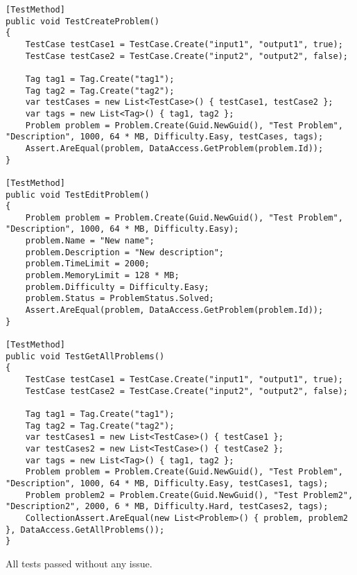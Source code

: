 \documentclass[report.tex]{subfiles}
\begin{document}
\begin{verbatim}
[TestMethod]
public void TestCreateProblem()
{
    TestCase testCase1 = TestCase.Create("input1", "output1", true);
    TestCase testCase2 = TestCase.Create("input2", "output2", false);

    Tag tag1 = Tag.Create("tag1");
    Tag tag2 = Tag.Create("tag2");
    var testCases = new List<TestCase>() { testCase1, testCase2 };
    var tags = new List<Tag>() { tag1, tag2 };
    Problem problem = Problem.Create(Guid.NewGuid(), "Test Problem", "Description", 1000, 64 * MB, Difficulty.Easy, testCases, tags);
    Assert.AreEqual(problem, DataAccess.GetProblem(problem.Id));
}

[TestMethod]
public void TestEditProblem()
{
    Problem problem = Problem.Create(Guid.NewGuid(), "Test Problem", "Description", 1000, 64 * MB, Difficulty.Easy);
    problem.Name = "New name";
    problem.Description = "New description";
    problem.TimeLimit = 2000;
    problem.MemoryLimit = 128 * MB;
    problem.Difficulty = Difficulty.Easy;
    problem.Status = ProblemStatus.Solved;
    Assert.AreEqual(problem, DataAccess.GetProblem(problem.Id));
}

[TestMethod]
public void TestGetAllProblems()
{
    TestCase testCase1 = TestCase.Create("input1", "output1", true);
    TestCase testCase2 = TestCase.Create("input2", "output2", false);

    Tag tag1 = Tag.Create("tag1");
    Tag tag2 = Tag.Create("tag2");
    var testCases1 = new List<TestCase>() { testCase1 };
    var testCases2 = new List<TestCase>() { testCase2 };
    var tags = new List<Tag>() { tag1, tag2 };
    Problem problem = Problem.Create(Guid.NewGuid(), "Test Problem", "Description", 1000, 64 * MB, Difficulty.Easy, testCases1, tags);
    Problem problem2 = Problem.Create(Guid.NewGuid(), "Test Problem2", "Description2", 2000, 6 * MB, Difficulty.Hard, testCases2, tags);
    CollectionAssert.AreEqual(new List<Problem>() { problem, problem2 }, DataAccess.GetAllProblems());
}
\end{verbatim}

All tests passed without any issue.
\end{document}
